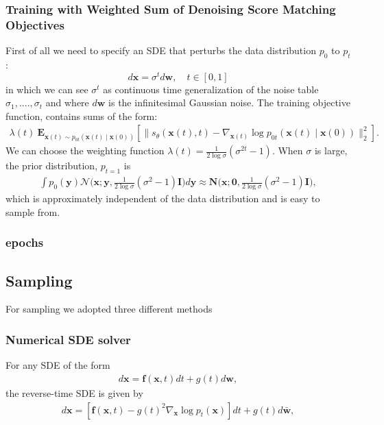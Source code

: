 \documentclass{article}
\begin{document}
\subsubsection{Training with Weighted Sum of Denoising Score Matching Objectives}
First of all we need to specify an SDE that perturbs the data distribution $p_0$ to $p_{t}$:
	\begin{equation}
		d \mathbf{x} = \sigma^t d\mathbf{w}, \quad t\in[0,1]
	\end{equation}
in which we can see $\sigma^t$ as continuous time generalization of the noise table $\sigma_{1},....,\sigma_t$ and where $d\mathbf{w}$ is the infinitesimal Gaussian noise. The training objective function, contains sums of the form:
\begin{align*}
\lambda(t)\  \mathbf{E}_{\mathbf{x}(t) \sim p_{0t}(\mathbf{x}(t) \mid \mathbf{x}(0))}[ \|s_\theta(\mathbf{x}(t), t) - \nabla_{\mathbf{x}(t)}\log p_{0t}(\mathbf{x}(t) \mid \mathbf{x}(0))\|_2^2].
\end{align*}
We can choose the weighting function $\lambda(t) = \frac{1}{2 \log \sigma}(\sigma^{2t} - 1)$. When $\sigma$ is large, the prior distribution, $p_{t=1}$ is
\begin{align*}
\int p_0(\mathbf{y})\mathcal{N}\bigg(\mathbf{x}; \mathbf{y}, \frac{1}{2 \log \sigma}(\sigma^2 - 1)\mathbf{I}\bigg) d \mathbf{y} \approx \mathbf{N}\bigg(\mathbf{x}; \mathbf{0}, \frac{1}{2 \log \sigma}(\sigma^2 - 1)\mathbf{I}\bigg),
\end{align*}
which is approximately independent of the data distribution and is easy to sample from.
\subsubsection{epochs}
\subsection{Sampling}
For sampling we adopted three different methods
\subsubsection{Numerical SDE solver}
For any SDE of the form
\begin{align*}
d \mathbf{x} = \mathbf{f}(\mathbf{x}, t) dt + g(t) d\mathbf{w},
\end{align*}
the reverse-time SDE is given by
\begin{align*}
d \mathbf{x} = [\mathbf{f}(\mathbf{x}, t) - g(t)^2 \nabla_\mathbf{x} \log p_t(\mathbf{x})] dt + g(t) d \bar{\mathbf{w}},
\end{align*}
\end{document}

